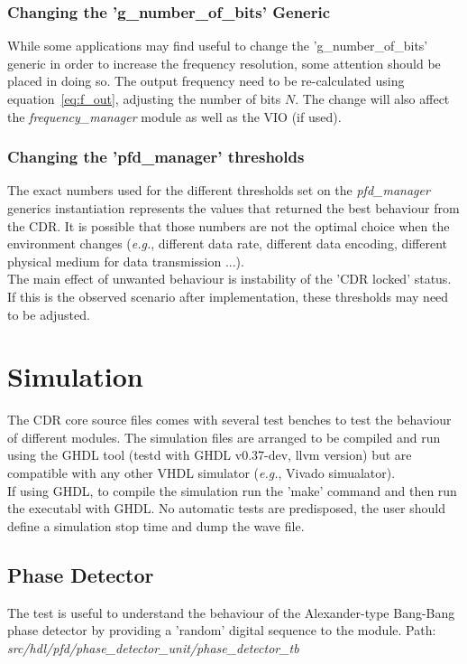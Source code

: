 \documentclass[11pt]{article}
\renewcommand{\>}{\rangle} \renewcommand{\emptyset}{\varnothing}
\begin{document}
\subsubsection{Changing the 'g\_number\_of\_bits' Generic}
While some applications may find useful to change the 'g\_number\_of\_bits'
generic in order to increase the frequency resolution, some attention should be
placed in doing so. The output frequency need to be re-calculated using
equation~\ref{eq:f_out}, adjusting the number of bits $N$. The change will also
affect the \textit{frequency\_manager} module as well as the VIO (if used).

\subsubsection{Changing the 'pfd\_manager' thresholds}
The exact numbers used for the different thresholds set on the
\textit{pfd\_manager} generics instantiation represents the values that returned
the best behaviour from the CDR. It is possible that those numbers are not the
optimal choice when the environment changes (\textit{e.g.}, different data rate,
different data encoding, different physical medium for data transmission ...).\\
The main effect of unwanted behaviour is instability of the 'CDR locked' status.
If this is the observed scenario after implementation, these thresholds may need
to be adjusted.

\section{Simulation}
The CDR core source files comes with several test benches to test the behaviour
of different modules. The simulation files are arranged to be compiled and run
using the GHDL tool (testd with GHDL v0.37-dev, llvm version) but are compatible
with any other VHDL simulator (\textit{e.g.}, Vivado simualator).\\
If using GHDL, to compile the simulation run the 'make' command and then run the
executabl with GHDL. No automatic tests are predisposed, the user should define
a simulation stop time and dump the wave file.

\subsection{Phase Detector}
The test is useful to understand the behaviour of the Alexander-type Bang-Bang
phase detector by providing a 'random' digital sequence to the module.\bigbreak
Path: \textit{src/hdl/pfd/phase\_detector\_unit/phase\_detector\_tb}
\end{document}
